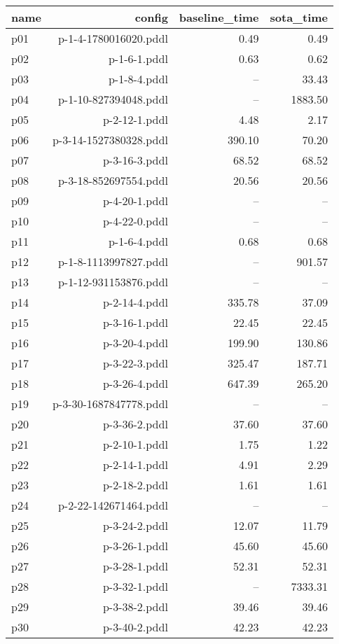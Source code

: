 \documentclass{article}
\begin{document}
                            \begin{center}
                            \scriptsize
                            \begin{tabular}{@{}l|r|r|r@{}}
                            name & config & baseline\_time & sota\_time\\\midrule
                              p01& p-1-4-1780016020.pddl&0.49&0.49\\
  p02& p-1-6-1.pddl&0.63&0.62\\
  p03& p-1-8-4.pddl&--&33.43\\
  p04& p-1-10-827394048.pddl&--&1883.50\\
  p05& p-2-12-1.pddl&4.48&2.17\\
  p06& p-3-14-1527380328.pddl&390.10&70.20\\
  p07& p-3-16-3.pddl&68.52&68.52\\
  p08& p-3-18-852697554.pddl&20.56&20.56\\
  p09& p-4-20-1.pddl&--&--\\
  p10& p-4-22-0.pddl&--&--\\
  p11& p-1-6-4.pddl&0.68&0.68\\
  p12& p-1-8-1113997827.pddl&--&901.57\\
  p13& p-1-12-931153876.pddl&--&--\\
  p14& p-2-14-4.pddl&335.78&37.09\\
  p15& p-3-16-1.pddl&22.45&22.45\\
  p16& p-3-20-4.pddl&199.90&130.86\\
  p17& p-3-22-3.pddl&325.47&187.71\\
  p18& p-3-26-4.pddl&647.39&265.20\\
  p19& p-3-30-1687847778.pddl&--&--\\
  p20& p-3-36-2.pddl&37.60&37.60\\
  p21& p-2-10-1.pddl&1.75&1.22\\
  p22& p-2-14-1.pddl&4.91&2.29\\
  p23& p-2-18-2.pddl&1.61&1.61\\
  p24& p-2-22-142671464.pddl&--&--\\
  p25& p-3-24-2.pddl&12.07&11.79\\
  p26& p-3-26-1.pddl&45.60&45.60\\
  p27& p-3-28-1.pddl&52.31&52.31\\
  p28& p-3-32-1.pddl&--&7333.31\\
  p29& p-3-38-2.pddl&39.46&39.46\\
  p30& p-3-40-2.pddl&42.23&42.23
                            \end{tabular}
                            \end{center}
                    
\end{document}

